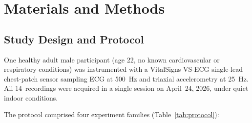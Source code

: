 \documentclass[conference]{IEEEtran}
\begin{document}
\section{Materials and Methods}
\label{sec:methods}

\subsection{Study Design and Protocol}
\label{ssec:protocol}

One healthy adult male participant (age 22, no known cardiovascular
or respiratory conditions) was instrumented with a VitalSigns VS-ECG
single-lead chest-patch sensor sampling ECG at 500~Hz and triaxial
accelerometry at 25~Hz.
All 14~recordings were acquired in a single session on April~24,
2026, under quiet indoor conditions.

The protocol comprised four experiment families
(Table~\ref{tab:protocol}):
\end{document}
